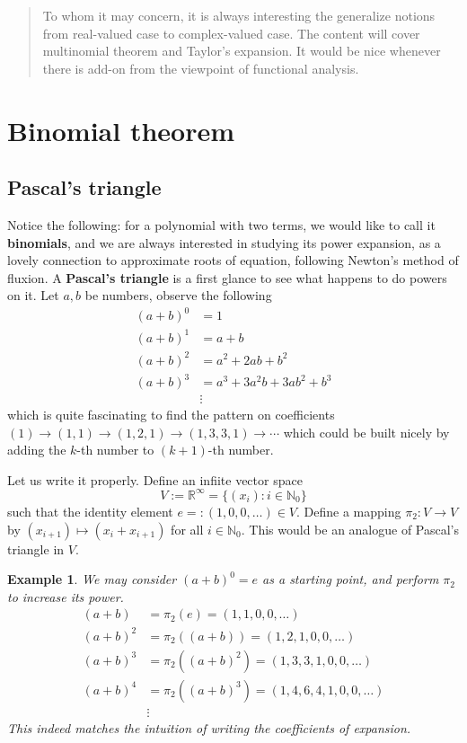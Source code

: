 \documentclass[12pt]{article}
\newtheorem*{example}{Example}
\begin{document}
    \begin{abstract}
        To whom it may concern, it is always interesting the generalize notions from real-valued case to complex-valued case. The content will cover multinomial theorem and Taylor's expansion. It would be nice whenever there is add-on from the viewpoint of functional analysis.
    \end{abstract}

    \section{Binomial theorem}

    \subsection{Pascal's triangle}

    Notice the following: for a polynomial with two terms, we would like to call it \textbf{binomials}, and we are always interested in studying its power expansion, as a lovely connection to approximate roots of equation, following Newton's method of fluxion. A \textbf{Pascal's triangle} is a first glance to see what happens to do powers on it. Let $a,b$ be numbers, observe the following\begin{align*}
        (a+b)^0&=1\\
        (a+b)^1&=a+b\\
        (a+b)^2&=a^2+2ab+b^2\\
        (a+b)^3&=a^3+3a^2b+3ab^2+b^3\\
        &\vdots
    \end{align*}
    which is quite fascinating to find the pattern on coefficients $(1)\to(1,1)\to(1,2,1)\to(1,3,3,1)\to\cdots$ which could be built nicely by adding the $k$-th number to $(k+1)$-th number.

    Let us write it properly. Define an infiite vector space \[V:=\mathbb{R}^{\infty}=\{(x_i):i\in\mathbb{N}_0\}\] such that the identity element $e=:(1,0,0,\dots)\in V$. Define a mapping $\pi_2:V\to V$ by $(x_{i+1})\mapsto (x_i+x_{i+1})$ for all $i\in\mathbb{N}_0$. This would be an analogue of Pascal's triangle in $V$.

    \begin{example}
        We may consider $(a+b)^0=e$ as a starting point, and perform $\pi_2$ to increase its power.\begin{align*}
            (a+b)&=\pi_2(e)=(1,1,0,0,\dots)\\
            (a+b)^2&=\pi_2((a+b))=(1,2,1,0,0,\dots)\\
            (a+b)^3&=\pi_2((a+b)^2)=(1,3,3,1,0,0,\dots)\\
            (a+b)^4&=\pi_2((a+b)^3)=(1,4,6,4,1,0,0,\dots)\\
            &\vdots
        \end{align*}
        This indeed matches the intuition of writing the coefficients of expansion.
    \end{example}
\end{document}
